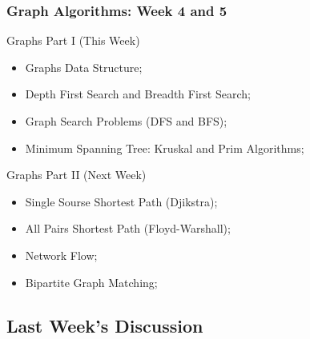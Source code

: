 \begin{frame}
  \frametitle{Graph Algorithms: Week 4 and 5}
  \begin{block}{Graphs Part I (This Week)}
    \begin{itemize}
    \item Graphs Data Structure;
    \item Depth First Search and Breadth First Search;
    \item Graph Search Problems (DFS and BFS);
    \item Minimum Spanning Tree: Kruskal and Prim Algorithms;
    \end{itemize}
  \end{block}
  \begin{block}{Graphs Part II (Next Week)}
    \begin{itemize}
    \item Single Sourse Shortest Path (Djikstra);
    \item All Pairs Shortest Path (Floyd-Warshall);
    \item Network Flow;
    \item Bipartite Graph Matching;
    \end{itemize}
  \end{block}
\end{frame}


\subsection{Last Week's Discussion}
